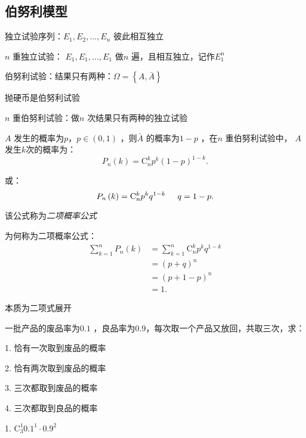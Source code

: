 \subsection{伯努利模型}%
\label{sub:伯努利模型}
\begin{notation}
    独立试验序列：$E_1,E_2,\ldots,E_n$ 彼此相互独立

    $n$ 重独立试验： $E_1,E_1,\ldots,E_1$ 做$n$ 遍，且相互独立，记作$E_1^{n}$

    伯努利试验：结果只有两种：$\Omega=\left\{ A,\bar{A} \right\} $
\end{notation}
\begin{eg}
    抛硬币是伯努利试验
\end{eg}
\begin{notation}
    $n$ 重伯努利试验：做$n$ 次结果只有两种的独立试验
\end{notation}
\begin{cor}
    $A$ 发生的概率为$ p$，$p\in (0,1)$ ，则$\bar{A}$ 的概率为$1-p$ ，在$n$ 重伯努利试验中， $A$ 发生$ k$次的概率为：
    \[
        P_n\left( k \right) =\mathrm{C}_{n}^{k}p^{k}\left( 1-p \right) ^{1-k}
    .\] 

    或：
    \[
        P_n\left( k \right) =\mathrm{C}_{n}^{k}p^{k}q^{1-k} \hspace{0.5cm} q=1-p
    .\] 

    该公式称为\textit{二项概率公式}
\end{cor}
\begin{notation}
    为何称为二项概率公式：
    \begin{align*}
        \sum_{k=1}^{n} P_n\left( k \right) &=\sum_{k=1}^{n} \mathrm{C}_{n}^{k}p^{k}q^{1-k}\\
        &= \left( p+q \right) ^{n} \\
        &= \left( p+1-p \right) ^{n} \\
        &= 1
    .\end{align*}

    本质为二项式展开
\end{notation}
\begin{eg}
    一批产品的废品率为$0.1$ ，良品率为$0.9$，每次取一个产品又放回，共取三次，求：

    1. 恰有一次取到废品的概率

    2. 恰有两次取到废品的概率

    3. 三次都取到废品的概率

    4. 三次都取到良品的概率
\end{eg}
1. $\mathrm{C}_{3}^{1}0.1^{1}\cdot 0.9^2$ 

